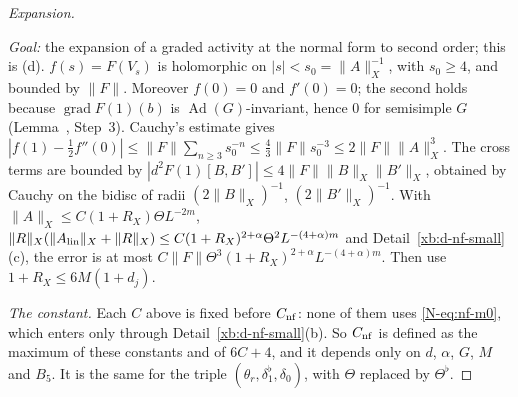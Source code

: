 \begin{proof}[Expansion]
\begin{step}
\emph{Goal:} the expansion of a graded activity at the normal form to second order; this is (d).
$f(s)=F(V_s)$ is holomorphic on $|s|<s_0=\|A\|_X^{-1}$, with $s_0\ge4$, and bounded by $\|F\|$. Moreover $f(0)=0$ and $f'(0)=0$; the second holds because $\operatorname{grad}F(1)(b)$ is $\operatorname{Ad}(G)$-invariant, hence $0$ for semisimple $G$ (Lemma~, Step~3). Cauchy's estimate gives $|f(1)-\frac12f''(0)|\le\|F\|\sum_{n\ge3}s_0^{-n}\le\frac43\|F\|s_0^{-3}\le2\|F\|\|A\|_X^3$. The cross terms are bounded by $|d^2F(1)[B,B']|\le4\|F\|\|B\|_X\|B'\|_X$, obtained by Cauchy on the bidisc of radii $(2\|B\|_X)^{-1}$, $(2\|B'\|_X)^{-1}$. With $\|A\|_X\le C(1+R_X)\Theta L^{-2m}$, $\|R\|_X(\|A_{\rm lin}\|_X+\|R\|_X)\le C(1+R_X)^{2+\alpha}\Theta^2L^{-(4+\alpha)m}$ and Detail~\ref{xb:d-nf-small}(c), the error is at most $C\|F\|\Theta^3(1+R_X)^{2+\alpha}L^{-(4+\alpha)m}$. Then use $1+R_X\le6M(1+d_j)$.
\end{step}

\emph{The constant.} Each $C$ above is fixed before $C_{\rm nf}$: none of them uses \eqref{N-eq:nf-m0}, which enters only through Detail~\ref{xb:d-nf-small}(b). So $C_{\rm nf}$ is defined as the maximum of these constants and of $6C+4$, and it depends only on $d$, $\alpha$, $G$, $M$ and $B_5$. It is the same for the triple $(\theta_r,\delta_1^\flat,\delta_0)$, with $\Theta$ replaced by $\Theta^\flat$.
\end{proof}

